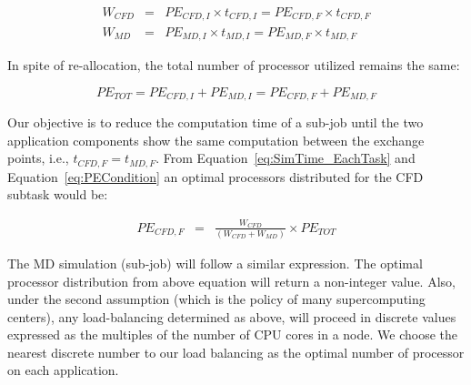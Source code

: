 \documentclass[conference,final]{IEEEtran}
\newcommand{\jhanote}[1]{ {\textcolor{red} { ***Jha: #1 }}}
\newcommand{\jhanote}[1]{}
\begin{document}
\small
\begin{eqnarray}
W_{CFD}&=&PE_{CFD,I}\times t_{CFD,I}=PE_{CFD,F}\times t_{CFD,F} \nonumber \\
W_{MD}&=&PE_{MD,I}\times t_{MD,I}=PE_{MD,F}\times t_{MD,F}
\label{eq:SimTime_EachTask}
\end{eqnarray}
\normalsize

In spite of re-allocation, the total number of processor utilized
remains the same:

\small
\begin{equation}
PE_{TOT}=PE_{CFD,I}+PE_{MD,I}=PE_{CFD,F}+PE_{MD,F}
\label{eq:PECondition}
\end{equation}
\normalsize

Our objective is to reduce the computation time of a sub-job until the
two application components show the same computation between the
exchange points, i.e., $t_{CFD,F} = t_{MD,F}$. From
Equation~\ref{eq:SimTime_EachTask} and Equation~\ref{eq:PECondition}
an optimal processors distributed for the CFD subtask would be:

\small
\begin{eqnarray}
PE_{CFD,F} & = & \frac {W_{CFD}} {(W_{CFD} + W_{MD})} \times PE_{TOT}
\end{eqnarray}
\normalsize

The MD simulation (sub-job) will follow a similar expression.  The
optimal processor distribution from above equation will return a
non-integer value. Also, under the second assumption (which is the
policy of many supercomputing centers), any load-balancing determined
as above, will proceed in discrete values
expressed as the multiples of the number of CPU cores in a node. We choose the nearest discrete number to our load balancing as the optimal number of processor on each application.

\end{document}
